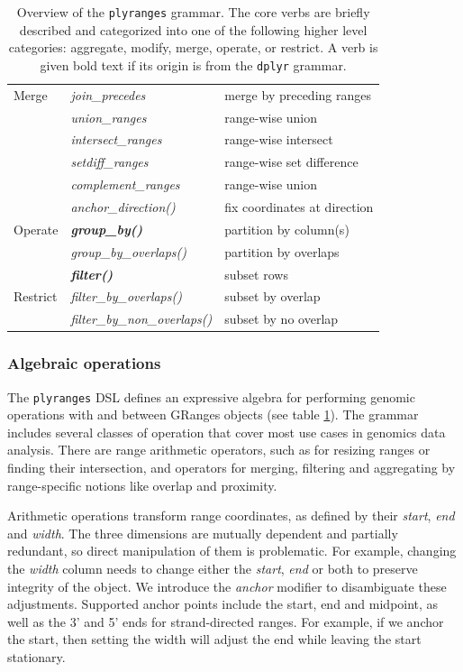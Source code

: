 \documentclass[]{article}
\begin{document}
\begin{table}[!htbp]
\begin{tabular}{|l|l|p{6cm}|}
    Merge & \emph{join\_precedes} & merge by preceding ranges \\
    & \emph{union\_ranges} & range-wise union \\
    & \emph{intersect\_ranges} & range-wise intersect \\
    & \emph{setdiff\_ranges} & range-wise set difference \\
    & \emph{complement\_ranges} & range-wise union \\
  \hline
   & \emph{anchor\_direction()} & fix coordinates at direction \\
  Operate & \textbf{\emph{group\_by()}} & partition by column(s)  \\ 
   & \emph{group\_by\_overlaps()} & partition by overlaps \\
   \hline
   & \textbf{\emph{filter()}} & subset rows \\
  Restrict & \emph{filter\_by\_overlaps()} & subset by overlap \\
    & \emph{filter\_by\_non\_overlaps()} & subset by no overlap \\
   \hline
\end{tabular}
\caption{Overview of the \texttt{plyranges} grammar. The core verbs are
briefly described and categorized into one of the following higher level 
categories: aggregate, modify, merge, operate, or restrict. A verb is given bold text if
its origin is from the \texttt{dplyr} grammar.}\label{tab:grammar}
\end{table}

\subsubsection{Algebraic operations}\label{algebraic-operations}

The \texttt{plyranges} DSL defines an expressive algebra for performing
genomic operations with and between GRanges objects (see table
\ref{tab:grammar}). The grammar includes several classes of operation
that cover most use cases in genomics data analysis. There are range
arithmetic operators, such as for resizing ranges or finding their
intersection, and operators for merging, filtering and aggregating by
range-specific notions like overlap and proximity.

Arithmetic operations transform range coordinates, as defined by their
\emph{start}, \emph{end} and \emph{width}. The three dimensions are
mutually dependent and partially redundant, so direct manipulation of
them is problematic. For example, changing the \emph{width} column needs
to change either the \emph{start}, \emph{end} or both to preserve
integrity of the object. We introduce the \emph{anchor} modifier to
disambiguate these adjustments. Supported anchor points include the
start, end and midpoint, as well as the 3' and 5' ends for
strand-directed ranges. For example, if we anchor the start, then
setting the width will adjust the end while leaving the start
stationary.
\end{document}
